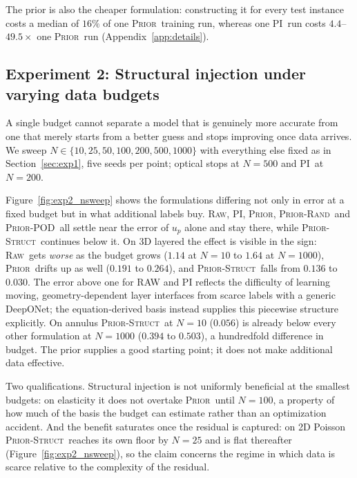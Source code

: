 \documentclass{article}
\newcommand{\armraw}{\textsc{Raw}}
\newcommand{\armpi}{\textsc{PI}}
\newcommand{\armprior}{\textsc{Prior}}
\newcommand{\armstruct}{\textsc{Prior-Struct}}
\newcommand{\armrand}{\textsc{Prior-Rand}}
\newcommand{\armpod}{\textsc{Prior-POD}}
\begin{document}
The prior is also the cheaper formulation: constructing it for every test instance costs a median of $16\%$ of one \armprior\ training run, whereas one \armpi\ run costs $4.4$--$49.5\times$ one \armprior\ run (Appendix~\ref{app:details}).

\vspace{-4mm}
\subsection{Experiment 2: Structural injection under varying data budgets}
\label{sec:exp2}

A single budget cannot separate a model that is genuinely more accurate from one that
merely starts from a better guess and stops improving once data arrives. We sweep
$N \in \{10, 25, 50, 100, 200, 500, 1000\}$ with everything else fixed as in
Section~\ref{sec:exp1}, five seeds per point; optical stops at $N{=}500$ and \armpi\ at
$N{=}200$.



Figure~\ref{fig:exp2_nsweep} shows the formulations differing not only in error at a fixed budget but in what additional labels buy. \armraw, \armpi, \armprior, \armrand\ and \armpod\ all settle near the error of $u_p$ alone and stay there, while \armstruct\ continues below it. On 3D layered the effect is visible in the sign: \armraw\ gets \emph{worse} as the
budget grows ($1.14$ at $N{=}10$ to $1.64$ at $N{=}1000$), \armprior\ drifts up as well ($0.191$ to $0.264$), and \armstruct\ falls from $0.136$ to $0.030$. 
The error above one for RAW and PI reflects the difficulty of learning moving, geometry-dependent layer interfaces from scarce labels with a generic DeepONet; the equation-derived basis instead supplies this piecewise structure explicitly.
On annulus \armstruct\ at $N{=}10$ ($0.056$) is already below every other formulation at $N{=}1000$ ($0.394$ to $0.503$), a hundredfold difference in budget. The prior supplies a good starting point; it does not make
additional data effective.

Two qualifications. Structural injection is not uniformly beneficial at the smallest budgets:
on elasticity it does not overtake \armprior\ until $N{=}100$, a property of how much of the basis the
budget can estimate rather than an optimization accident. And the
benefit saturates once the residual is captured: on 2D Poisson \armstruct\ reaches its own
floor by $N{=}25$ and is flat thereafter (Figure~\ref{fig:exp2_nsweep}), so the claim
concerns the regime in which data is scarce relative to the complexity of the residual.
\end{document}
